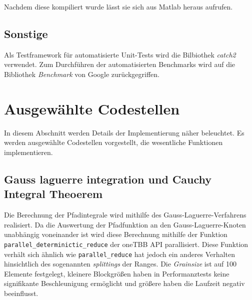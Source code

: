 Nachdem diese kompiliert wurde lässt sie sich aus Matlab heraus aufrufen.


\subsection{Sonstige}

Als Testframework für automatisierte Unit-Tests wird die Bilbiothek \textit{catch2} verwendet.
Zum Durchführen der automatisierten Benchmarks wird auf die Bibliothek \textit{Benchmark} von Google zurückgegriffen.






\section{Ausgewählte Codestellen}

In diesem Abschnitt werden Details der Implementierung näher beleuchtet. Es werden ausgewählte Codestellen vorgestellt, die wesentliche Funktionen implementieren.

\subsection{Gauss laguerre integration und Cauchy Integral Theoerem}\label{gauss_laguerre_section}

Die Berechnung der Pfadintegrale wird mithilfe des Gauss-Laguerre-Verfahrens realisiert.
Da die Auswertung der Pfadfunktion an den Gauss-Laguerre-Knoten unabhängig voneinander ist wird diese Berechnung mithilfe der Funktion \texttt{parallel\_determinictic\_reduce} der oneTBB API parallisiert.
Diese Funktion verhält sich ähnlich wie \texttt{parallel\_reduce} hat jedoch ein anderes Verhalten hinsichtlich des sogenannten \textit{splittings} der Ranges. 
Die \textit{Grainsize} ist auf 100 Elemente festgelegt, kleinere Blockgrößen haben in Performanztests keine signifikante Beschleunigung ermöglicht und größere haben die Laufzeit negativ beeinflusst.

